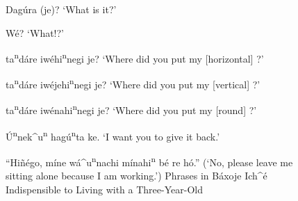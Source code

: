 \documentclass[output=paper]{LSP/langsci}
\begin{document}
\begin{figure}[p]
\begin{list}{}{}
\item{Dag\'ura (je)? `What is it?'}
\item{W\'e? `What!?'}
\item{\underline{\hspace{1em}} ta\textsuperscript{n}d\'are iw\'ehi\textsuperscript{n}negi  je? `Where did you put my [horizontal] \underline{\hspace{1em}}?'}
\item{\underline{\hspace{1em}} ta\textsuperscript{n}d\'are iw\'ejehi\textsuperscript{n}negi je? `Where did you put my [vertical] \underline{\hspace{1em}}?'}
\item{\underline{\hspace{1em}} ta\textsuperscript{n}d\'are iw\'enahi\textsuperscript{n}negi je? `Where did you put my [round] \underline{\hspace{1em}}?'}
\item{\'U\textsuperscript{n}nek\^{ }u\textsuperscript{n} hag\'u\textsuperscript{n}ta ke. `I want you to give it back.'}
\end{list} 
\caption{``Hi\~n\'ego, m\'ine w\'a\^{ }u\textsuperscript{n}nachi m\'inahi\textsuperscript{n} b\'e re h\'o.''\newline
(`No, please leave me sitting alone because I am working.')\newline
Phrases in B\'axoje Ich\^{ }\'e Indispensible to Living with a Three-Year-Old}
\label{phraselist1}
\end{figure}
\FloatBarrier
\end{document}
